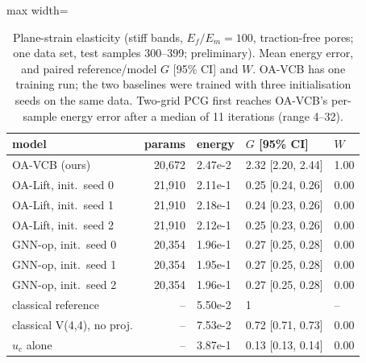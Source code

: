 \begin{table}[tbp]\centering\footnotesize\setlength{\tabcolsep}{4pt}
\caption{Plane-strain elasticity (stiff bands, $E_f/E_m=100$, traction-free pores; one data set, test samples 300--399; preliminary). Mean energy error, and paired reference/model $G$ [95\% CI] and $W$. OA-VCB has one training run; the two baselines were trained with three initialisation seeds on the same data. Two-grid PCG first reaches OA-VCB's per-sample energy error after a median of 11 iterations (range 4--32).}\label{tab:elasticity}
\begin{adjustbox}{max width=\linewidth}
\begin{tabular}{lrlll}\toprule
model & params & energy & $G$ [95\% CI] & $W$ \\\midrule
OA-VCB (ours) & 20{,}672 & 2.47e-2 & 2.32 [2.20, 2.44] & 1.00 \\
OA-Lift, init.\ seed 0 & 21{,}910 & 2.11e-1 & 0.25 [0.24, 0.26] & 0.00 \\
OA-Lift, init.\ seed 1 & 21{,}910 & 2.18e-1 & 0.24 [0.23, 0.26] & 0.00 \\
OA-Lift, init.\ seed 2 & 21{,}910 & 2.12e-1 & 0.25 [0.23, 0.26] & 0.00 \\
GNN-op, init.\ seed 0 & 20{,}354 & 1.96e-1 & 0.27 [0.25, 0.28] & 0.00 \\
GNN-op, init.\ seed 1 & 20{,}354 & 1.95e-1 & 0.27 [0.25, 0.28] & 0.00 \\
GNN-op, init.\ seed 2 & 20{,}354 & 1.96e-1 & 0.27 [0.25, 0.28] & 0.00 \\
\midrule
classical reference & -- & 5.50e-2 & 1 & -- \\
classical V(4,4), no proj. & -- & 7.53e-2 & 0.72 [0.71, 0.73] & 0.00 \\
$u_c$ alone & -- & 3.87e-1 & 0.13 [0.13, 0.14] & 0.00 \\
\bottomrule\end{tabular}
\end{adjustbox}
\end{table}
